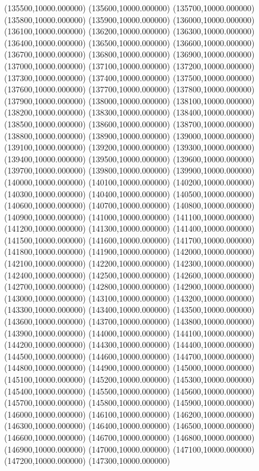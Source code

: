 (135500,10000.000000)
(135600,10000.000000)
(135700,10000.000000)
(135800,10000.000000)
(135900,10000.000000)
(136000,10000.000000)
(136100,10000.000000)
(136200,10000.000000)
(136300,10000.000000)
(136400,10000.000000)
(136500,10000.000000)
(136600,10000.000000)
(136700,10000.000000)
(136800,10000.000000)
(136900,10000.000000)
(137000,10000.000000)
(137100,10000.000000)
(137200,10000.000000)
(137300,10000.000000)
(137400,10000.000000)
(137500,10000.000000)
(137600,10000.000000)
(137700,10000.000000)
(137800,10000.000000)
(137900,10000.000000)
(138000,10000.000000)
(138100,10000.000000)
(138200,10000.000000)
(138300,10000.000000)
(138400,10000.000000)
(138500,10000.000000)
(138600,10000.000000)
(138700,10000.000000)
(138800,10000.000000)
(138900,10000.000000)
(139000,10000.000000)
(139100,10000.000000)
(139200,10000.000000)
(139300,10000.000000)
(139400,10000.000000)
(139500,10000.000000)
(139600,10000.000000)
(139700,10000.000000)
(139800,10000.000000)
(139900,10000.000000)
(140000,10000.000000)
(140100,10000.000000)
(140200,10000.000000)
(140300,10000.000000)
(140400,10000.000000)
(140500,10000.000000)
(140600,10000.000000)
(140700,10000.000000)
(140800,10000.000000)
(140900,10000.000000)
(141000,10000.000000)
(141100,10000.000000)
(141200,10000.000000)
(141300,10000.000000)
(141400,10000.000000)
(141500,10000.000000)
(141600,10000.000000)
(141700,10000.000000)
(141800,10000.000000)
(141900,10000.000000)
(142000,10000.000000)
(142100,10000.000000)
(142200,10000.000000)
(142300,10000.000000)
(142400,10000.000000)
(142500,10000.000000)
(142600,10000.000000)
(142700,10000.000000)
(142800,10000.000000)
(142900,10000.000000)
(143000,10000.000000)
(143100,10000.000000)
(143200,10000.000000)
(143300,10000.000000)
(143400,10000.000000)
(143500,10000.000000)
(143600,10000.000000)
(143700,10000.000000)
(143800,10000.000000)
(143900,10000.000000)
(144000,10000.000000)
(144100,10000.000000)
(144200,10000.000000)
(144300,10000.000000)
(144400,10000.000000)
(144500,10000.000000)
(144600,10000.000000)
(144700,10000.000000)
(144800,10000.000000)
(144900,10000.000000)
(145000,10000.000000)
(145100,10000.000000)
(145200,10000.000000)
(145300,10000.000000)
(145400,10000.000000)
(145500,10000.000000)
(145600,10000.000000)
(145700,10000.000000)
(145800,10000.000000)
(145900,10000.000000)
(146000,10000.000000)
(146100,10000.000000)
(146200,10000.000000)
(146300,10000.000000)
(146400,10000.000000)
(146500,10000.000000)
(146600,10000.000000)
(146700,10000.000000)
(146800,10000.000000)
(146900,10000.000000)
(147000,10000.000000)
(147100,10000.000000)
(147200,10000.000000)
(147300,10000.000000)
